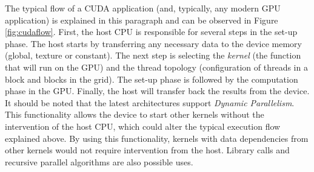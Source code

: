 The typical flow of a CUDA application (and, typically, any modern GPU application) is explained in this paragraph and can be observed in Figure \ref{fig:cudaflow}.
First, the host CPU is responsible for several steps in the set-up phase.
The host starts by transferring any necessary data to the device memory (global, texture or constant).
The next step is selecting the \emph{kernel} (the function that will run on the GPU) and the thread topology (configuration of threads in a block and blocks in the grid).
The set-up phase is followed by the computation phase in the GPU.
Finally, the host will transfer back the results from the device.
It should be noted that the latest architectures support \emph{Dynamic Parallelism}.
This functionality allows the device to start other kernels without the intervention of the host CPU, which could alter the typical execution flow explained above.
By using this functionality, kernels with data dependencies from other kernels would not require intervention from the host.
Library calls and recursive parallel algorithms are also possible uses.

